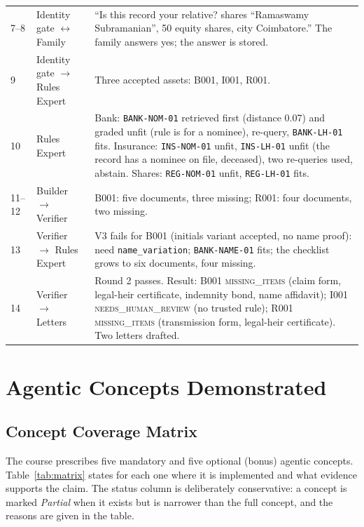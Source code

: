 \documentclass[12pt,a4paper,oneside]{report}
\begin{document}
{\begin{longtable}{@{}l p{2.5cm} p{9.0cm}@{}}
7--8 & Identity gate $\leftrightarrow$ Family & ``Is this record your relative? shares ``Ramaswamy Subramanian'', 50 equity shares, city Coimbatore.'' The family answers yes; the answer is stored. \\
9 & Identity gate $\to$ Rules Expert & Three accepted assets: B001, I001, R001. \\
10 & Rules Expert & Bank: \texttt{BANK-NOM-01} retrieved first (distance 0.07) and graded unfit (rule is for a nominee), re-query, \texttt{BANK-LH-01} fits. Insurance: \texttt{INS-NOM-01} unfit, \texttt{INS-LH-01} unfit (the record has a nominee on file, deceased), two re-queries used, abstain. Shares: \texttt{REG-NOM-01} unfit, \texttt{REG-LH-01} fits. \\
11--12 & Builder $\to$ Verifier & B001: five documents, three missing; R001: four documents, two missing. \\
13 & Verifier $\to$ Rules Expert & V3 fails for B001 (initials variant accepted, no name proof): need \texttt{name\_variation}; \texttt{BANK-NAME-01} fits; the checklist grows to six documents, four missing. \\
14 & Verifier $\to$ Letters & Round 2 passes. Result: B001 \textsc{missing\_items} (claim form, legal-heir certificate, indemnity bond, name affidavit); I001 \textsc{needs\_human\_review} (no trusted rule); R001 \textsc{missing\_items} (transmission form, legal-heir certificate). Two letters drafted. \\ \bottomrule
\end{longtable}}

\chapter{Agentic Concepts Demonstrated}\label{ch:concepts}
\section{Concept Coverage Matrix}
The course prescribes five mandatory and five optional (bonus) agentic concepts. Table~\ref{tab:matrix} states for each one where it is implemented and what evidence supports the claim. The status column is deliberately conservative: a concept is marked \emph{Partial} when it exists but is narrower than the full concept, and the reasons are given in the table.
\end{document}
